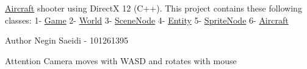 \mbox{\hyperlink{class_aircraft}{Aircraft}} shooter using DirectX 12 (C++). This project contains these following classes\+: 1-\/ \mbox{\hyperlink{class_game}{Game}} 2-\/ \mbox{\hyperlink{class_world}{World}} 3-\/ \mbox{\hyperlink{class_scene_node}{Scene\+Node}} 4-\/ \mbox{\hyperlink{class_entity}{Entity}} 5-\/ \mbox{\hyperlink{class_sprite_node}{Sprite\+Node}} 6-\/ \mbox{\hyperlink{class_aircraft}{Aircraft}} \begin{DoxyAuthor}{Author}
Negin Saeidi -\/ 101261395 
\end{DoxyAuthor}
\begin{DoxyAttention}{Attention}
Camera moves with WASD and rotates with mouse 
\end{DoxyAttention}
